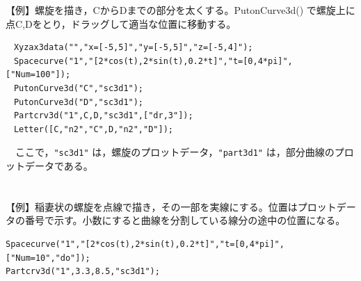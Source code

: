 \documentclass[papersize,a4paper,12pt,uplatex]{jsarticle}
\begin{document}
\begin{description}
【例】螺旋を描き，CからDまでの部分を太くする。PutonCurve3d() で螺旋上に点C,Dをとり，ドラッグして適当な位置に移動する。
\begin{verbatim}
　Xyzax3data("","x=[-5,5]","y=[-5,5]","z=[-5,4]");
　Spacecurve("1","[2*cos(t),2*sin(t),0.2*t]","t=[0,4*pi]",["Num=100"]);
　PutonCurve3d("C","sc3d1");
　PutonCurve3d("D","sc3d1");
　Partcrv3d("1",C,D,"sc3d1",["dr,3"]);
　Letter([C,"n2","C",D,"n2","D"]);
\end{verbatim}
　ここで，\verb|"sc3d1"| は，螺旋のプロットデータ，\verb|"part3d1"| は，部分曲線のプロットデータである。\\
　　　　　　　\\
　\\
【例】稲妻状の螺旋を点線で描き，その一部を実線にする。位置はプロットデータの番号で示す。小数にすると曲線を分割している線分の途中の位置になる。
\begin{verbatim}
Spacecurve("1","[2*cos(t),2*sin(t),0.2*t]","t=[0,4*pi]",["Num=10","do"]);
Partcrv3d("1",3.3,8.5,"sc3d1");
\end{verbatim}
　　　　　　　\\


\end{description}
\end{document}
